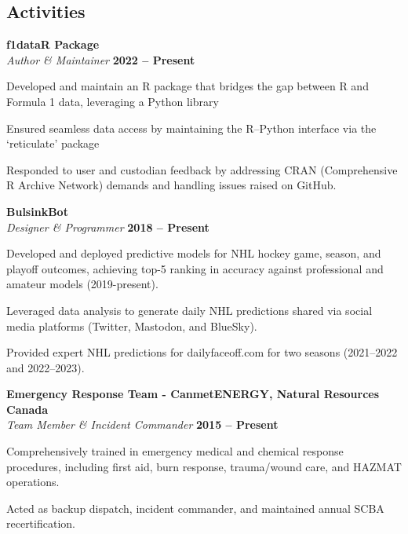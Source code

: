\documentclass[margin,line]{resumecls}
\begin{document}
\begin{resume}
    \section{\mysidestyle Activities}

    \textbf{f1dataR Package}\\\vspace{1mm}%
    \textsl{Author \& Maintainer} \hfill \textbf{2022 -- Present}\\\vspace{-5mm}%
    \begin{list2}
        \item Developed and maintain an R package that bridges the gap between R and Formula 1 data, leveraging a Python library
        \item Ensured seamless data access by maintaining the R--Python interface via the `reticulate' package
        \item Responded to user and custodian feedback by addressing CRAN (Comprehensive R Archive Network) demands and handling issues raised on GitHub.
    \end{list2}

    \textbf{BulsinkBot}\\\vspace{1mm}%
    \textsl{Designer \& Programmer} \hfill \textbf{2018 -- Present}\\\vspace{-5mm}%
    \begin{list2}
        \item Developed and deployed predictive models for NHL hockey game, season, and playoff outcomes, achieving top-5 ranking in accuracy against professional and amateur models (2019-present).
        \item Leveraged data analysis to generate daily NHL predictions shared via social media platforms (Twitter, Mastodon, and BlueSky).
        \item Provided expert NHL predictions for dailyfaceoff.com for two seasons (2021--2022 and 2022--2023).
    \end{list2}

    \textbf{Emergency Response Team - CanmetENERGY, Natural Resources Canada}\\\vspace{1mm}%
    \textsl{Team Member \& Incident Commander} \hfill \textbf{2015 -- Present}\\\vspace{-5mm}%
    \begin{list2}
        \item Comprehensively trained in emergency medical and chemical response procedures, including first aid, burn response, trauma/wound care, and HAZMAT operations.
        \item Acted as backup dispatch, incident commander, and maintained annual SCBA recertification.
    \end{list2}


\end{resume}
\end{document}
